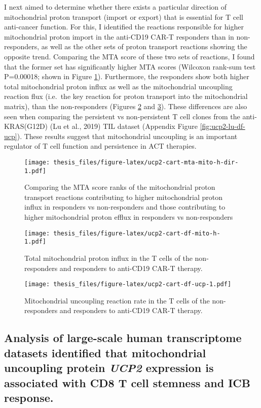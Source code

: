\documentclass[12pt,twoside,openany,\mydriver]{thesis}  %
\begin{document}
I next aimed to determine whether there exists a particular direction of mitochondrial proton transport (import or export) that is essential for T cell anti-cancer function. For this, I identified the reactions responsible for higher mitochondrial proton import in the anti-CD19 CAR-T responders than in non-responders, as well as the other sets of proton transport reactions showing the opposite trend. Comparing the MTA score of these two sets of reactions, I found that the former set has significantly higher MTA scores (Wilcoxon rank-sum test P=0.00018; shown in Figure \ref{fig:ucp2-cart-mta-mito-h-dir}). Furthermore, the responders show both higher total mitochondrial proton influx as well as the mitochondrial uncoupling reaction flux (i.e.~the key reaction for proton transport into the mitochondrial matrix), than the non-responders (Figures \ref{fig:ucp2-cart-df-mito-h} and \ref{fig:ucp2-cart-df-ucp}). These differences are also seen when comparing the persistent vs non-persistent T cell clones from the anti-KRAS(G12D) (Lu et al., 2019) TIL dataset (Appendix Figure \ref{fig:ucp2-lu-df-ucp}). These results suggest that mitochondrial uncoupling is an important regulator of T cell function and persistence in ACT therapies.
\begin{figure}
\centering
\texttt{[image: thesis\_files/figure-latex/ucp2-cart-mta-mito-h-dir-1.pdf]}
\caption{\label{fig:ucp2-cart-mta-mito-h-dir}Comparing the MTA score ranks of the mitochondrial proton transport reactions contributing to higher mitochondrial proton influx in responders vs non-responders and those contributing to higher mitochondrial proton efflux in responders vs non-responders}
\end{figure}
\begin{figure}
\centering
\texttt{[image: thesis\_files/figure-latex/ucp2-cart-df-mito-h-1.pdf]}
\caption{\label{fig:ucp2-cart-df-mito-h}Total mitochondrial proton influx in the T cells of the non-responders and responders to anti-CD19 CAR-T therapy.}
\end{figure}
\begin{figure}
\centering
\texttt{[image: thesis\_files/figure-latex/ucp2-cart-df-ucp-1.pdf]}
\caption{\label{fig:ucp2-cart-df-ucp}Mitochondrial uncoupling reaction rate in the T cells of the non-responders and responders to anti-CD19 CAR-T therapy.}
\end{figure}
\hypertarget{analysis-of-large-scale-human-transcriptome-datasets-identified-that-mitochondrial-uncoupling-protein-ucp2-expression-is-associated-with-cd8-t-cell-stemness-and-icb-response.}{%
\subsection{\texorpdfstring{Analysis of large-scale human transcriptome datasets identified that mitochondrial uncoupling protein \emph{UCP2} expression is associated with CD8 T cell stemness and ICB response.}{Analysis of large-scale human transcriptome datasets identified that mitochondrial uncoupling protein UCP2 expression is associated with CD8 T cell stemness and ICB response.}}\label{analysis-of-large-scale-human-transcriptome-datasets-identified-that-mitochondrial-uncoupling-protein-ucp2-expression-is-associated-with-cd8-t-cell-stemness-and-icb-response.}}
\end{document}
